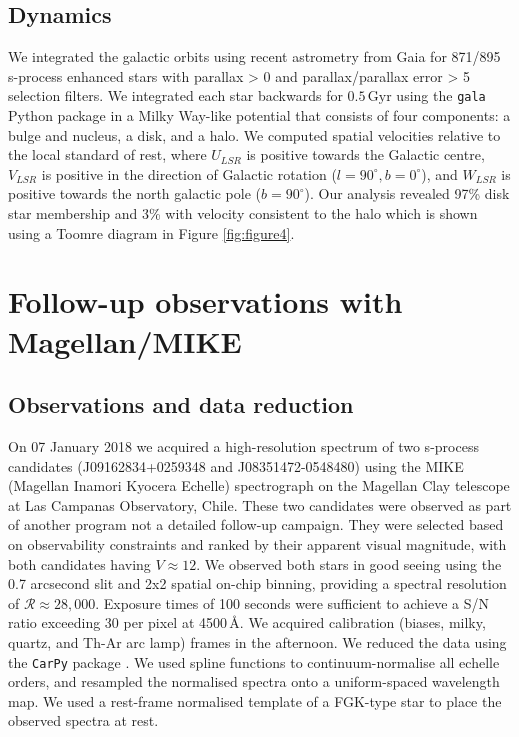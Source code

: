 \documentclass[a4paper,fleqn,usenatbib]{mnras}
\begin{document}
\subsection{Dynamics}
We integrated the galactic orbits using recent astrometry from Gaia \citep{gaia2016,gaia2018b, cropper2018, katz2018, lindegren2018, sartoretti2018} for 871/895 s-process enhanced stars with parallax > 0 and parallax/parallax error > 5 selection filters. We integrated each star backwards for $0.5\,\textrm{Gyr}$ using the \texttt{gala} Python package \citep{price2017} in a Milky Way-like potential \citep{mwpotential2014} that consists of four components: a \citet{hernquist1990} bulge and nucleus, a \citet{miyamoto1975} disk, and a \citet{nfw1997} halo. We computed spatial velocities relative to the local standard of rest, where $U_{LSR}$ is positive towards the Galactic centre, $V_{LSR}$ is positive in the direction of Galactic rotation ($l=90^{\circ}, b=0^{\circ}$), and $W_{LSR}$ is positive towards the north galactic pole ($b=90^{\circ}$). Our analysis revealed 97\% disk star membership and 3\% with velocity consistent to the halo which is shown using a Toomre diagram in Figure \ref{fig:figure4}.

\section{Follow-up observations with Magellan/MIKE} \label{sec:observations}

\subsection{Observations and data reduction}
On 07 January 2018 we acquired a high-resolution spectrum of two s-process candidates (J09162834+0259348 and J08351472-0548480) using the MIKE (Magellan Inamori Kyocera Echelle) \citep{bernstein2003} spectrograph on the Magellan Clay telescope \citep{schectman2003} at Las Campanas Observatory, Chile. These two candidates were observed as part of another program not a detailed follow-up campaign. They were selected based on observability constraints and ranked by their apparent visual magnitude, with both candidates having $V \approx 12$. We observed both stars in good seeing using the 0.7 arcsecond slit and 2x2 spatial on-chip binning, providing a spectral resolution of $\mathcal{R} \approx 28,000$. Exposure times of 100 seconds were sufficient to achieve a S/N ratio exceeding 30 per pixel at 4500\,\AA. We acquired calibration (biases, milky, quartz, and Th-Ar arc lamp) frames in the afternoon. We reduced the data using the \texttt{CarPy} package \citep{kelson2000}. We used spline functions to continuum-normalise all echelle orders, and resampled the normalised spectra onto a uniform-spaced wavelength map. We used a rest-frame normalised template of a FGK-type star to place the observed spectra at rest.
\end{document}
